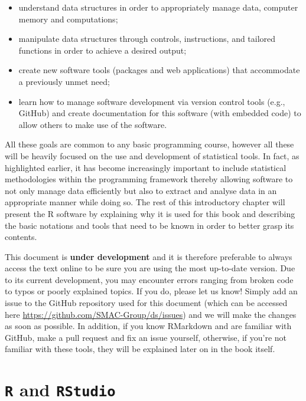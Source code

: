 \documentclass[]{book}
\providecommand{\tightlist}{%
  \setlength{\itemsep}{0pt}\setlength{\parskip}{0pt}}
\theoremstyle{definition}
\theoremstyle{definition}
\theoremstyle{remark}
\let\BeginKnitrBlock\begin \let\EndKnitrBlock\end
\begin{document}
\begin{itemize}
\tightlist
\item
  understand data structures in order to appropriately manage data,
  computer memory and computations;
\item
  manipulate data structures through controls, instructions, and
  tailored functions in order to achieve a desired output;
\item
  create new software tools (packages and web applications) that
  accommodate a previously unmet need;
\item
  learn how to manage software development via version control tools
  (e.g., GitHub) and create documentation for this software (with
  embedded code) to allow others to make use of the software.
\end{itemize}

All these goals are common to any basic programming course, however all
these will be heavily focused on the use and development of statistical
tools. In fact, as highlighted earlier, it has become increasingly
important to include statistical methodologies within the programming
framework thereby allowing software to not only manage data efficiently
but also to extract and analyse data in an appropriate manner while
doing so. The rest of this introductory chapter will present the R
software by explaining why it is used for this book and describing the
basic notations and tools that need to be known in order to better grasp
its contents.

\BeginKnitrBlock{rmdimportant}
This document is \textbf{under development} and it is therefore
preferable to always access the text online to be sure you are using the
most up-to-date version. Due to its current development, you may
encounter errors ranging from broken code to typos or poorly explained
topics. If you do, please let us know! Simply add an issue to the GitHub
repository used for this document (which can be accessed here
\url{https://github.com/SMAC-Group/ds/issues}) and we will make the
changes as soon as possible. In addition, if you know RMarkdown and are
familiar with GitHub, make a pull request and fix an issue yourself,
otherwise, if you're not familiar with these tools, they will be
explained later on in the book itself.
\EndKnitrBlock{rmdimportant}

\section{\texorpdfstring{\texttt{R} and
\texttt{RStudio}}{R and RStudio}}\label{r-and-rstudio}
\end{document}
